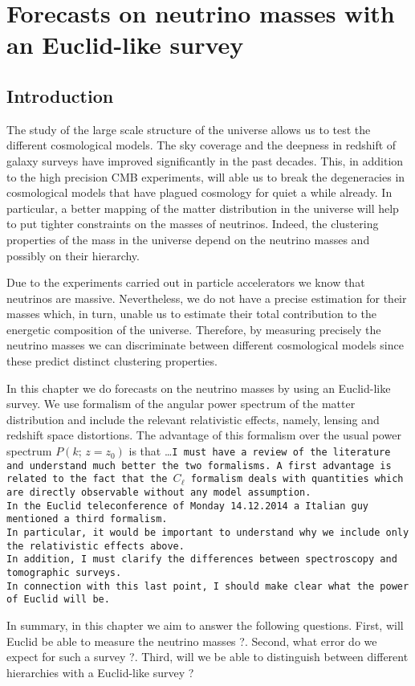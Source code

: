 \chapter{Forecasts on neutrino masses with an Euclid-like survey}
\label{chapter:7}

\section{Introduction}

The study of the large scale structure of the universe allows us to test the different cosmological models. The sky coverage and the deepness in redshift of  galaxy surveys have improved significantly in the past decades. This, in addition to the high precision CMB experiments, will able us to break the degeneracies in cosmological models that have plagued cosmology for quiet a while already. In particular, a better mapping of the matter distribution in the universe will help to put tighter constraints on the masses of neutrinos. Indeed, the clustering properties of the mass in the universe depend on the neutrino masses and possibly on their hierarchy. 

Due to the experiments carried out in particle accelerators we know that neutrinos are massive. Nevertheless, we do not have a precise estimation for their masses which, in turn, unable us to estimate their total contribution to the energetic composition of the universe. Therefore, by measuring precisely the neutrino masses we can discriminate between different cosmological models since these predict distinct clustering properties. 

In this chapter we do forecasts on the neutrino masses by using an Euclid-like survey. We use formalism of the angular power spectrum of the matter distribution and include the relevant relativistic effects, namely, lensing and redshift space distortions. The advantage of this formalism over the usual power spectrum $P(k;\, z=z_0)$ is that \dots \texttt{I must have a review of the literature and understand much better the two formalisms. A first advantage is related to the fact that the $C_{\ell}$ formalism deals with quantities which are directly observable without any model assumption. \\
In the Euclid teleconference of Monday 14.12.2014 a Italian guy mentioned a third formalism. \\
In particular, it would be important to understand why we include only the relativistic effects above. \\
In addition, I must clarify the differences between spectroscopy and tomographic surveys. \\
In connection with this last point, I should make clear what the power of Euclid will be.}

In summary, in this chapter we aim to answer the following questions. First, will Euclid be able to measure the neutrino masses ?. Second, what error do we expect for such a survey ?. Third, will we be able to distinguish between different hierarchies with a Euclid-like survey ? 
